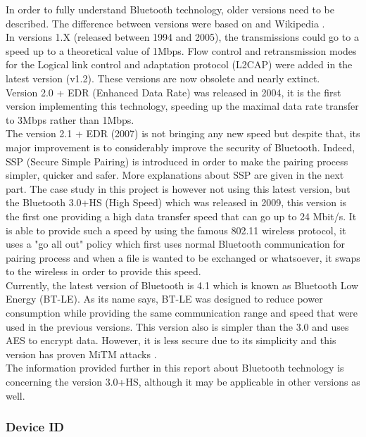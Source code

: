 In order to fully understand Bluetooth technology, older versions need to be described. The difference between versions were based on \cite{btdiff} and Wikipedia \cite{btwiki}.\\
In versions 1.X (released between 1994 and 2005), the transmissions could go to a speed up to a theoretical value of 1Mbps. Flow control and retransmission modes for the Logical link control and adaptation protocol (L2CAP) were added in the latest version (v1.2). These versions are now obsolete and nearly extinct.\\
Version 2.0 + EDR (Enhanced Data Rate) was released in 2004, it is the first version implementing this technology, speeding up the maximal data rate transfer to 3Mbps rather than 1Mbps.\\
The version 2.1 + EDR (2007) is not bringing any new speed but despite that, its major improvement is to considerably improve the security of Bluetooth. Indeed, SSP (Secure Simple Pairing) is introduced in order to make the pairing process simpler, quicker and safer. More explanations about SSP are given in the next part.\newpage
The case study in this project is however not using this latest version, but the Bluetooth 3.0+HS (High Speed) which was released in 2009, this version is  the first one providing a high data transfer speed that can go up to 24 Mbit/s. It is able to provide such a speed by using the famous 802.11 wireless protocol, it uses a "go all out" policy which first uses normal Bluetooth communication for pairing process and when a file is wanted to be exchanged or whatsoever,  it swaps to the wireless in order to provide this speed.\\
Currently, the latest version of Bluetooth is 4.1 which is known as Bluetooth Low Energy (BT-LE). As its name says, BT-LE was designed to reduce power consumption while providing the same communication range and speed that were used in the previous versions. This version also is simpler than the 3.0 and uses AES to encrypt data. However, it is less secure due to its simplicity and this version has proven MiTM attacks \cite{hitbox_mike_ryan}.\\
The information provided further in this report about Bluetooth technology is concerning the version 3.0+HS, although it may be applicable in other versions as well.

\subsubsection{Device ID}

